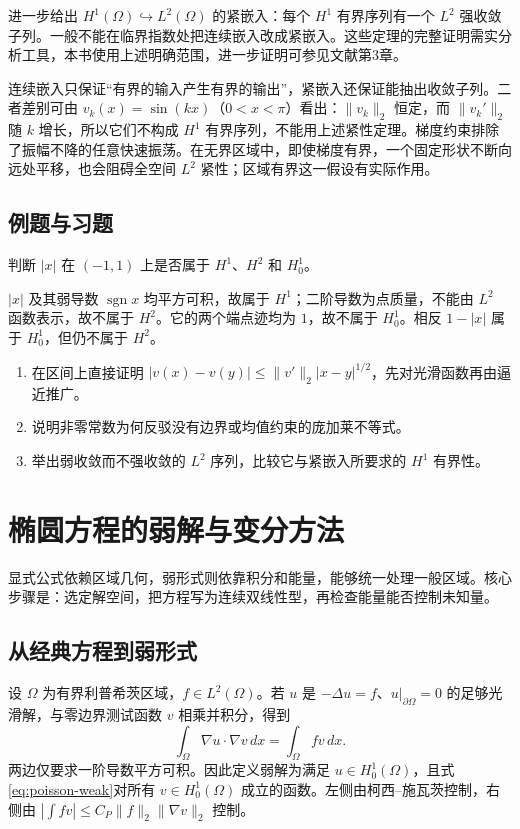 \documentclass[UTF8,12pt,a4paper,fontset=fandol]{ctexbook}
\begin{document}
进一步给出 $H^1(\Omega)\hookrightarrow L^2(\Omega)$ 的紧嵌入：每个 $H^1$ 有界序列有一个 $L^2$ 强收敛子列。一般不能在临界指数处把连续嵌入改成紧嵌入。这些定理的完整证明需实分析工具，本书使用上述明确范围，进一步证明可参见文献\cite{hunter}第3章。

连续嵌入只保证“有界的输入产生有界的输出”，紧嵌入还保证能抽出收敛子列。二者差别可由 $v_k(x)=\sin(kx)$（$0<x<\pi$）看出：$\|v_k\|_2$ 恒定，而 $\|v_k'\|_2$ 随 $k$ 增长，所以它们不构成 $H^1$ 有界序列，不能用上述紧性定理。梯度约束排除了振幅不降的任意快速振荡。在无界区域中，即使梯度有界，一个固定形状不断向远处平移，也会阻碍全空间 $L^2$ 紧性；区域有界这一假设有实际作用。

\section{例题与习题}
\begin{example}
判断 $|x|$ 在 $(-1,1)$ 上是否属于 $H^1$、$H^2$ 和 $H_0^1$。
\end{example}
\begin{solve}
$|x|$ 及其弱导数 $\operatorname{sgn}x$ 均平方可积，故属于 $H^1$；二阶导数为点质量，不能由 $L^2$ 函数表示，故不属于 $H^2$。它的两个端点迹均为 $1$，故不属于 $H_0^1$。相反 $1-|x|$ 属于 $H_0^1$，但仍不属于 $H^2$。
\end{solve}
\begin{enumerate}
 \item 在区间上直接证明 $|v(x)-v(y)|\le\|v'\|_2|x-y|^{1/2}$，先对光滑函数再由逼近推广。
 \item 说明非零常数为何反驳没有边界或均值约束的庞加莱不等式。
 \item 举出弱收敛而不强收敛的 $L^2$ 序列，比较它与紧嵌入所要求的 $H^1$ 有界性。
\end{enumerate}

\chapter{椭圆方程的弱解与变分方法}
\label{chap:elliptic-weak}

显式公式依赖区域几何，弱形式则依靠积分和能量，能够统一处理一般区域。核心步骤是：选定解空间，把方程写为连续双线性型，再检查能量能否控制未知量。

\section{从经典方程到弱形式}
设 $\Omega$ 为有界利普希茨区域，$f\in L^2(\Omega)$。若 $u$ 是 $-\Delta u=f$、$u|_{\partial\Omega}=0$ 的足够光滑解，与零边界测试函数 $v$ 相乘并积分，得到
\begin{equation}
 \int_\Omega\nabla u\cdot\nabla v\,dx=\int_\Omega fv\,dx.
 \label{eq:poisson-weak}
\end{equation}
两边仅要求一阶导数平方可积。因此定义弱解为满足 $u\in H_0^1(\Omega)$，且式\eqref{eq:poisson-weak}对所有 $v\in H_0^1(\Omega)$ 成立的函数。左侧由柯西--施瓦茨控制，右侧由 $|\int fv|\le C_P\|f\|_2\|\nabla v\|_2$ 控制。
\end{document}
